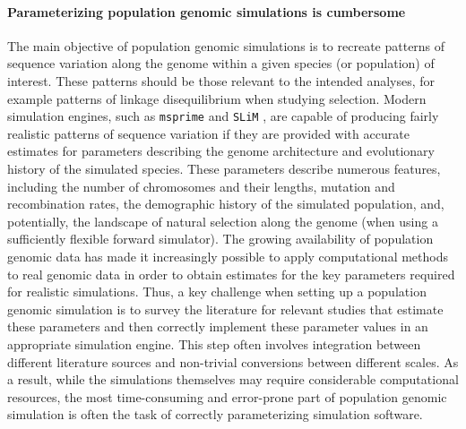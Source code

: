 \documentclass[hidelinks]{article}
\begin{document}
\paragraph*{Parameterizing population genomic simulations is cumbersome}
The main objective of population genomic simulations is to recreate 
patterns of sequence variation along the genome within a given species (or population)
of interest. These patterns should be those relevant to the intended analyses,
for example patterns of linkage disequilibrium when studying selection.
Modern simulation engines, such as \texttt{msprime} \citep{Kelleher2016,Nelson2020}
and \texttt{SLiM} \citep{Haller2019}, are capable of producing fairly realistic patterns of sequence variation
if they are provided with accurate estimates for parameters describing the genome architecture
and evolutionary history of the simulated species.
These parameters describe numerous features, including the number of chromosomes and their lengths,
mutation and recombination rates, the demographic history of the simulated population,
and, potentially, the landscape of natural selection along the genome (when using a sufficiently flexible forward simulator).
The growing availability of population genomic data has made it increasingly possible
to apply computational methods to real genomic data in order to obtain estimates
for the key parameters required for realistic simulations.
Thus, a key challenge when setting up a population genomic simulation is to
survey the literature for relevant studies that estimate these parameters
and then correctly implement these parameter values in an appropriate simulation engine.
This step often involves integration between different literature sources and
non-trivial conversions between different scales.
As a result, while the simulations themselves may require considerable computational resources,
the most time-consuming and error-prone part of population genomic simulation is
often the task of correctly parameterizing simulation software.
\end{document}
